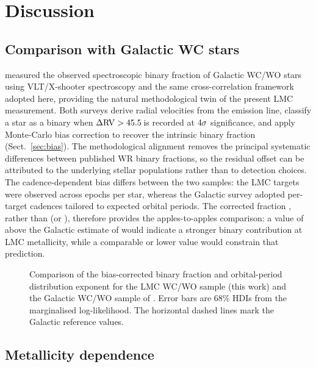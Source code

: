 \section{Discussion}
\label{sec:discussion}

\subsection{Comparison with Galactic WC stars}
\label{sec:comparison_mw}

\citet{Dsilva2023} measured the observed spectroscopic binary fraction of
Galactic WC/WO stars using VLT/X-shooter spectroscopy and the same
cross-correlation framework adopted here, providing the natural
methodological twin of the present LMC measurement. Both surveys derive
radial velocities from the \primaryline emission line, classify a star as
a binary when $\Delta\mathrm{RV} > 45.5$\,\kms is recorded at
$4\sigma$ significance, and apply Monte-Carlo bias correction to
recover the intrinsic binary fraction (Sect.~\ref{sec:bias}). The
methodological alignment removes the principal systematic differences
between published WR binary fractions, so the residual offset can be
attributed to the underlying stellar populations rather than to detection
choices. The cadence-dependent bias differs between the two samples: the
LMC targets were observed across \Nepochs epochs per star, whereas the
Galactic survey adopted per-target cadences tailored to expected orbital
periods. The corrected fraction \fbincorr, rather than \fbinobs (or
\fbinFinal), therefore provides the apples-to-apples comparison: a value
of \fbincorr above the Galactic estimate of \citet{Dsilva2023} would
indicate a stronger binary contribution at LMC metallicity, while a
comparable or lower value would constrain that prediction.

\begin{figure}
\centering
\caption{Comparison of the bias-corrected binary fraction and
  orbital-period distribution exponent for the LMC WC/WO sample (this
  work) and the Galactic WC/WO sample of \citet{Dsilva2023}. Error bars
  are 68\% HDIs from the marginalised log-likelihood. The horizontal
  dashed lines mark the Galactic reference values.}
\label{fig:lmc_vs_mw}
\end{figure}

\subsection{Metallicity dependence}
\label{sec:metallicity}

